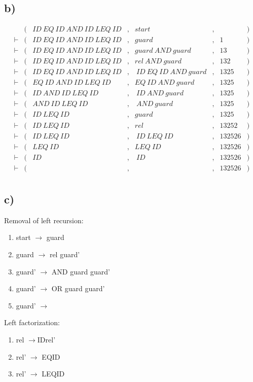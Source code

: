 \subsection*{b)}

\begin{equation*}
  \begin{aligned}
   &(&ID\:EQ\:ID\:AND\:ID\:LEQ\:ID&,& start&,& &) \\
\vdash &(&ID\:EQ\:ID\:AND\:ID\:LEQ\:ID&,& guard&,& 1&) \\
\vdash &(&ID\:EQ\:ID\:AND\:ID\:LEQ\:ID&,& guard\:AND\:guard&,& 13&) \\
\vdash &(&ID\:EQ\:ID\:AND\:ID\:LEQ\:ID&,& rel\:AND\:guard&,& 132&) \\
\vdash &(&ID\:EQ\:ID\:AND\:ID\:LEQ\:ID&,&\:ID\:EQ\:ID\:AND\:guard&,& 1325&) \\
\vdash &(&EQ\:ID\:AND\:ID\:LEQ\:ID&,& EQ\:ID\:AND\:guard&,& 1325&) \\
\vdash &(&ID\:AND\:ID\:LEQ\:ID&,&\:ID\:AND\:guard&,& 1325&) \\
\vdash &(&AND\:ID\:LEQ\:ID&,&\:AND\:guard&,& 1325&) \\
\vdash &(&ID\:LEQ\:ID&,& guard&,& 1325&) \\
\vdash &(&ID\:LEQ\:ID&,& rel&,& 13252&) \\
\vdash &(&ID\:LEQ\:ID&,&\:ID\:LEQ\:ID&,& 132526&) \\
\vdash &(&LEQ\:ID&,& LEQ\:ID&,& 132526&) \\
\vdash &(&ID&,&\:ID&,& 132526&) \\
\vdash &(&&,& &,& 132526&) \\
\end{aligned}
\end{equation*}

\subsection*{c)}
Removal of left recursion:

\begin{enumerate}
\item start $\rightarrow$ guard
\item guard $\rightarrow$ rel guard'
\item guard' $\rightarrow$ AND guard guard'
\item guard' $\rightarrow$ OR guard guard'
\item guard' $\rightarrow$  
\end{enumerate}

Left factorization:

\begin{enumerate}
\item rel $\rightarrow$\:ID\:rel'
\item rel' $\rightarrow$ EQ\:ID
\item rel' $\rightarrow$ LEQ\:ID
\end{enumerate}